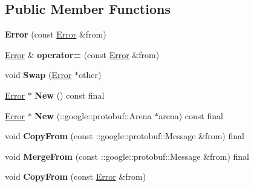 \subsection*{Public Member Functions}
\begin{DoxyCompactItemize}
\item 
\mbox{\label{classcoappbrpc_1_1Error_a1a325665c85fc96f082a311cb3e3fc23}} 
{\bfseries Error} (const \hyperlink{classcoappbrpc_1_1Error}{Error} \&from)
\item 
\mbox{\label{classcoappbrpc_1_1Error_a06adcbeeca663447f9cf0387740f0744}} 
\hyperlink{classcoappbrpc_1_1Error}{Error} \& {\bfseries operator=} (const \hyperlink{classcoappbrpc_1_1Error}{Error} \&from)
\item 
\mbox{\label{classcoappbrpc_1_1Error_a0e09aab9715bdfa1c467f9ca7c4ed75a}} 
void {\bfseries Swap} (\hyperlink{classcoappbrpc_1_1Error}{Error} $\ast$other)
\item 
\mbox{\label{classcoappbrpc_1_1Error_ae52bf2329532524ec95a3e60225a62a2}} 
\hyperlink{classcoappbrpc_1_1Error}{Error} $\ast$ {\bfseries New} () const final
\item 
\mbox{\label{classcoappbrpc_1_1Error_ac4bce964cb8730485d628a206af6d117}} 
\hyperlink{classcoappbrpc_1_1Error}{Error} $\ast$ {\bfseries New} (\+::google\+::protobuf\+::\+Arena $\ast$arena) const final
\item 
\mbox{\label{classcoappbrpc_1_1Error_abf9ba3b9723a2d981aaf83d22ec8757a}} 
void {\bfseries Copy\+From} (const \+::google\+::protobuf\+::\+Message \&from) final
\item 
\mbox{\label{classcoappbrpc_1_1Error_ab853399916ca41d8eaa2aab0535533d0}} 
void {\bfseries Merge\+From} (const \+::google\+::protobuf\+::\+Message \&from) final
\item 
\mbox{\label{classcoappbrpc_1_1Error_a52ca8b242a78f111be7735895160a1a3}} 
void {\bfseries Copy\+From} (const \hyperlink{classcoappbrpc_1_1Error}{Error} \&from)
\item 
\mbox{\label{classcoappbrpc_1_1Error_a9b8eca3a850aa4c53c8b46203c2dbffd}} 

\end{DoxyCompactItemize}
